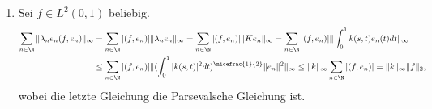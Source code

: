 \begin{solution}
\begin{enumerate}[label = (\alph*)]
  \item Sei $f \in L^2(0,1)$ beliebig.
  \begin{align*}
    \sum_{n \in \N}\|\lambda_n e_n (f,e_n)\|_{\infty} &=
    \sum_{n \in \N}|(f,e_n)|\|\lambda_ne_n\|_{\infty} =
    \sum_{n \in \N}|(f,e_n)|\|Ke_n\|_{\infty} =
    \sum_{n \in \N}|(f,e_n)|\|\int_0^1k(s,t)e_n(t)dt\|_{\infty} \\ &\leq
    \sum_{n \in \N}|(f,e_n)|\|(\int_0^1|k(s,t)|^2dt)^{\nicefrac{1}{2}}\|e_n\|^2\|_{\infty} \leq
    \|k\|_{\infty}\sum_{n \in \N}|(f,e_n)| = \|k\|_{\infty}\|f\|_2,
  \end{align*}
  wobei die letzte Gleichung die Parsevalsche Gleichung ist.
\end{enumerate}
\end{solution}
